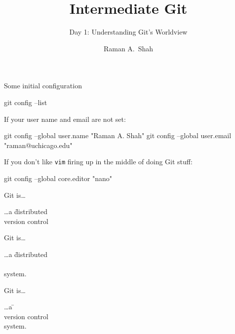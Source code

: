 

\title{Intermediate Git}
\subtitle{Day 1: Understanding Git's Worldview}
\author{Raman A.~Shah}
\date{}



\begin{frame}[plain]
  \titlepage
\end{frame}

\begin{frame}[fragile]{Some initial configuration}
  \begin{gitCommand}git config --list\end{gitCommand}

  If your user name and email are not set:

  \begin{gitCommand}
git config --global user.name "Raman A. Shah"
git config --global user.email "raman@uchicago.edu"
  \end{gitCommand}

  If you don't like \texttt{vim} firing up in the middle of doing Git stuff:

  \begin{gitCommand}git config --global core.editor "nano"\end{gitCommand}

\end{frame}

\begin{frame}{Git is\ldots}
  \Huge {
    \begin{tabbing}
      \ldots a \= distributed \\
      \> version control \\
      \> \color{ucMaroon}{system}\color{black}{.}
    \end{tabbing}
  }
\end{frame}

\begin{frame}{Git is\ldots}
  \Huge {
    \begin{tabbing}
      \ldots a \= distributed \\
      \> \color{ucMaroon}{version control} \\
      \> system.
    \end{tabbing}
  }
\end{frame}

\begin{frame}{Git is\ldots}
  \Huge {
    \begin{tabbing}
      \ldots a \= \color{ucMaroon}{distributed} \\
      \> version control \\
      \> system.
    \end{tabbing}
  }
\end{frame}

